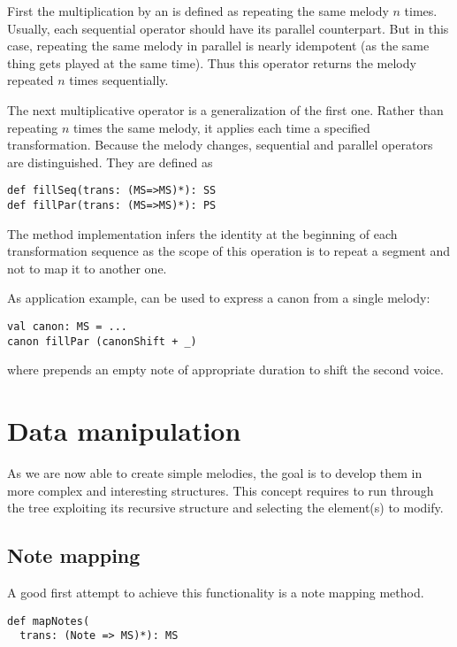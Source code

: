 \documentclass[twocolumn, 11pt]{article}
\begin{document}
First the multiplication by an  is defined as repeating the same melody $n$ times. Usually, each sequential operator should have its parallel counterpart. But in this case, repeating the same melody in parallel is nearly idempotent (as the same thing gets played at the same time). Thus this operator returns the melody repeated $n$ times sequentially.

The next multiplicative operator is a generalization of the first one. Rather than repeating $n$ times the same melody, it applies each time a specified transformation. Because the melody changes, sequential and parallel operators are distinguished. They are defined as
\begin{lstlisting}
def fillSeq(trans: (MS=>MS)*): SS
def fillPar(trans: (MS=>MS)*): PS
\end{lstlisting}
The method implementation infers the identity at the beginning of each transformation sequence as the scope of this operation is to repeat a segment and not to map it to another one.

As application example,  can be used to express a canon from a single melody:
\begin{lstlisting}
val canon: MS = ...
canon fillPar (canonShift + _)
\end{lstlisting}
where  prepends an empty note of appropriate duration to shift the second voice.

\section{Data manipulation}

As we are now able to create simple melodies, the goal is to develop them in more complex and interesting structures.
This concept requires to run through the tree exploiting its recursive structure and selecting the element(s) to modify.



\subsection{Note mapping}

A good first attempt to achieve this functionality is a note mapping method.

\begin{lstlisting}
def mapNotes(
  trans: (Note => MS)*): MS
\end{lstlisting}
\end{document}

